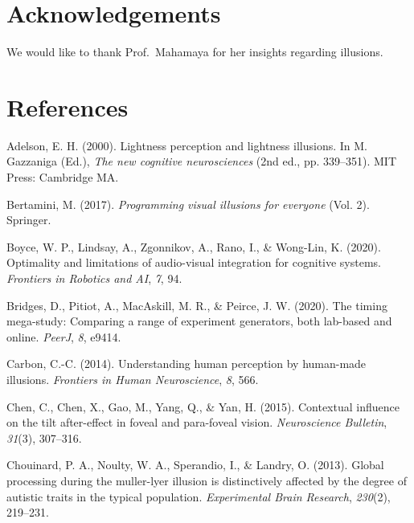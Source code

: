 \documentclass[
  english,
  man,floatsintext]{apa6}
\newlength{\cslhangindent}
\newenvironment{cslreferences}%
  {\setlength{\parindent}{0pt}%
  \everypar{\setlength{\hangindent}{\cslhangindent}}\ignorespaces}%
  {\par}
\begin{document}
\hypertarget{acknowledgements}{%
\section{Acknowledgements}\label{acknowledgements}}

We would like to thank Prof.~Mahamaya for her insights regarding illusions.

\newpage

\hypertarget{references}{%
\section{References}\label{references}}

\begingroup
\setlength{\parindent}{-0.5in}
\setlength{\leftskip}{0.5in}

\hypertarget{refs}{}
\begin{cslreferences}
\leavevmode\hypertarget{ref-adelson200024}{}%
Adelson, E. H. (2000). Lightness perception and lightness illusions. In M. Gazzaniga (Ed.), \emph{The new cognitive neurosciences} (2nd ed., pp. 339--351). MIT Press: Cambridge MA.

\leavevmode\hypertarget{ref-bertamini2017programming}{}%
Bertamini, M. (2017). \emph{Programming visual illusions for everyone} (Vol. 2). Springer.

\leavevmode\hypertarget{ref-boyce2020optimality}{}%
Boyce, W. P., Lindsay, A., Zgonnikov, A., Rano, I., \& Wong-Lin, K. (2020). Optimality and limitations of audio-visual integration for cognitive systems. \emph{Frontiers in Robotics and AI}, \emph{7}, 94.

\leavevmode\hypertarget{ref-bridges2020timing}{}%
Bridges, D., Pitiot, A., MacAskill, M. R., \& Peirce, J. W. (2020). The timing mega-study: Comparing a range of experiment generators, both lab-based and online. \emph{PeerJ}, \emph{8}, e9414.

\leavevmode\hypertarget{ref-carbon2014understanding}{}%
Carbon, C.-C. (2014). Understanding human perception by human-made illusions. \emph{Frontiers in Human Neuroscience}, \emph{8}, 566.

\leavevmode\hypertarget{ref-chen2015contextual}{}%
Chen, C., Chen, X., Gao, M., Yang, Q., \& Yan, H. (2015). Contextual influence on the tilt after-effect in foveal and para-foveal vision. \emph{Neuroscience Bulletin}, \emph{31}(3), 307--316.

\leavevmode\hypertarget{ref-chouinard2013global}{}%
Chouinard, P. A., Noulty, W. A., Sperandio, I., \& Landry, O. (2013). Global processing during the muller-lyer illusion is distinctively affected by the degree of autistic traits in the typical population. \emph{Experimental Brain Research}, \emph{230}(2), 219--231.


\end{cslreferences}
\end{document}
